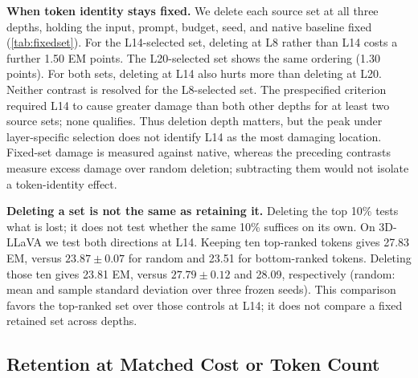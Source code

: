 \textbf{When token identity stays fixed.} We delete each source set at all three depths, holding the input, prompt, budget, seed, and native baseline fixed (\cref{tab:fixedset}). For the L14-selected set, deleting at L8 rather than L14 costs a further 1.50 EM points. The L20-selected set shows the same ordering (1.30 points). For both sets, deleting at L14 also hurts more than deleting at L20. Neither contrast is resolved for the L8-selected set. The prespecified criterion required L14 to cause greater damage than both other depths for at least two source sets; none qualifies. Thus deletion depth matters, but the peak under layer-specific selection does not identify L14 as the most damaging location. Fixed-set damage is measured against native, whereas the preceding contrasts measure excess damage over random deletion; subtracting them would not isolate a token-identity effect.

\textbf{Deleting a set is not the same as retaining it.} Deleting the top 10\% tests what is lost; it does not test whether the same 10\% suffices on its own. On 3D-LLaVA we test both directions at L14. Keeping ten top-ranked tokens gives 27.83 EM, versus $23.87\pm0.07$ for random and 23.51 for bottom-ranked tokens. Deleting those ten gives 23.81 EM, versus $27.79\pm0.12$ and 28.09, respectively (random: mean and sample standard deviation over three frozen seeds). This comparison favors the top-ranked set over those controls at L14; it does not compare a fixed retained set across depths.

\subsection{Retention at Matched Cost or Token Count}
\begin{table}[t]
\centering
\caption{\textbf{LLaVA-3D ScanQA validation schedule grid.} All 4675 questions are evaluated; GeoGate uses L14/R10. KV and FLOPs estimate LM cost, not total memory or latency.}
\label{tab:scanqa}
\end{table}

